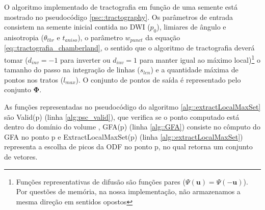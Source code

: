 \documentclass[
    12pt,                %
    oneside,            %
    a4paper,            %
    english,            %
    french,                %
    spanish,            %
    brazil                %
    ]{abntex2}
\begin{document}
O algoritmo implementado de tractografia em função de uma semente está mostrado no pseudocódigo \ref{psc::tractography}. Os parâmetros de entrada consistem na semente inicial contida no DWI ($p_0$), limiares de ângulo e anisotropia ($\theta_{thr}$ e $t_{aniso}$), o parâmetro $w_{punct}$ da equação \ref{eq::tractografia_chamberland}, o sentido que o algoritmo de tractografia deverá tomar ($d_{inv} = -1$ para inverter ou $d_{inv} = 1$ para manter igual ao máximo local)\footnote{Funções representativas de difusão são funções pares ($\Psi(\mathbf{u}) = \Psi(\mathbf{-u})$). Por questões de memória, na nossa implementação, não armazenamos a mesma direção em sentidos opostos}  o tamanho do passo na integração de linhas ($s_{len}$) e a quantidade máxima de pontos nos tratos ($l_{max}$). O conjunto de pontos de saída é representado pelo conjunto $\mathbf{\Phi}$.


As funções representadas no pseudocódigo do algoritmo \ref{alg::extractLocalMaxSet} são Valid(p) (linha \ref{alg:psc_valid}), que verifica se o ponto computado está dentro do domínio do volume , GFA(p) (linha \ref{alg::GFA}) consiste no cômputo do GFA no ponto p e ExtractLocalMaxSet(p) (linha \ref{alg::extractLocalMaxSet}) representa a escolha de picos da ODF no ponto p, no qual retorna um conjunto de vetores.




\end{document}

